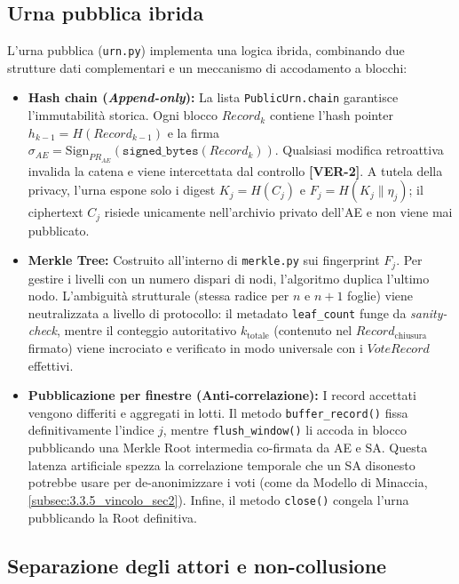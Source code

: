 \subsection{Urna pubblica ibrida}
\label{subsec:wp4_urna}

L'urna pubblica (\texttt{urn.py}) implementa una logica ibrida, combinando due strutture dati complementari e un meccanismo di accodamento a blocchi:

\begin{itemize}
  \item \textbf{Hash chain (\emph{Append-only}):} La lista \texttt{PublicUrn.chain} garantisce l'immutabilità storica. Ogni blocco $\mathit{Record}_k$ contiene l'hash pointer $h_{k-1} = H(\mathit{Record}_{k-1})$ e la firma $\sigma_{\mathit{AE}} = \mathrm{Sign}_{PR_{AE}}(\texttt{signed\_bytes}(\mathit{Record}_k))$. Qualsiasi modifica retroattiva invalida la catena e viene intercettata dal controllo \textbf{[VER-2]}. A tutela della privacy, l'urna espone solo i digest $K_j = H(C_j)$ e $F_j = H(K_j \| \eta_j)$; il ciphertext $C_j$ risiede unicamente nell'archivio privato dell'AE e non viene mai pubblicato.

  \item \textbf{Merkle Tree:} Costruito all'interno di \texttt{merkle.py} sui fingerprint $F_j$. Per gestire i livelli con un numero dispari di nodi, l'algoritmo duplica l'ultimo nodo. L'ambiguità strutturale (stessa radice per $n$ e $n+1$ foglie) viene neutralizzata a livello di protocollo: il metadato \texttt{leaf\_count} funge da \emph{sanity-check}, mentre il conteggio autoritativo $k_{\text{totale}}$ (contenuto nel $\mathit{Record}_{\text{chiusura}}$ firmato) viene incrociato e verificato in modo universale con i $\mathit{VoteRecord}$ effettivi.

  \item \textbf{Pubblicazione per finestre (Anti-correlazione):} I record accettati vengono differiti e aggregati in lotti. Il metodo \texttt{buffer\_record()} fissa definitivamente l'indice $j$, mentre \texttt{flush\_window()} li accoda in blocco pubblicando una Merkle Root intermedia co-firmata da AE e SA. Questa latenza artificiale spezza la correlazione temporale che un SA disonesto potrebbe usare per de-anonimizzare i voti (come da Modello di Minaccia, \ref{subsec:3.3.5_vincolo_sec2}). Infine, il metodo \texttt{close()} congela l'urna pubblicando la Root definitiva.
\end{itemize}

\subsection{Separazione degli attori e non-collusione}
\label{sec:wp4_non_collusione}

